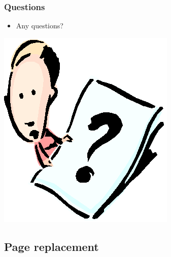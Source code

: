 \documentclass[CJKutf8,xcolor=pdftex,dvipsnames,table]{beamer}
\begin{document}
\begin{CJK*}{UTF8}{song}
  \begin{frame}
    \frametitle{Questions}
    \begin{itemize}
    \item{Any questions?}
    \end{itemize}
    \begin{center}
      \includegraphics[scale=.5]{question}
    \end{center}
  \end{frame}

  \subsection{Page replacement}
  

\end{CJK*}
\end{document}
